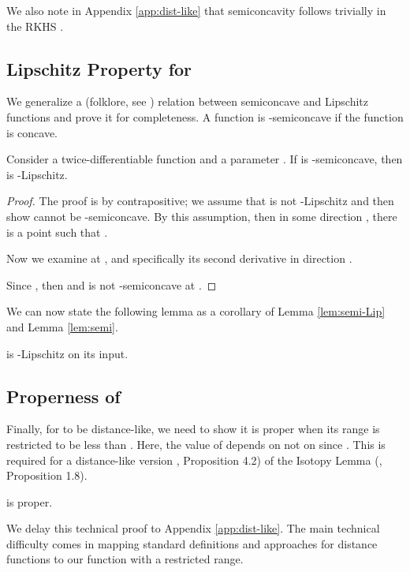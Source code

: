 \documentclass[11pt]{myclass}
\begin{document}
We also note in Appendix \ref{app:dist-like} that semiconcavity follows trivially in the RKHS .  

\subsection{Lipschitz Property for }
\label{sec:lipschitz}

We generalize a (folklore, see \cite{ChazalCohen-SteinerMerigot2011}) relation between semiconcave and Lipschitz functions and prove it for completeness.  
A function  is -semiconcave if the function  is concave.  

\begin{lemma}
Consider a twice-differentiable function  and a parameter .  
If  is -semiconcave, then  is -Lipschitz.  
\label{lem:semi-Lip}
\end{lemma}
\begin{proof}
The proof is by contrapositive; we assume that  is not -Lipschitz and then show  cannot be -semiconcave.  
By this assumption, then in some direction , there is a point  such that .  

Now we examine  at , and specifically its second derivative in direction . 

Since , then  and  is not -semiconcave at .  
\end{proof}

We can now state the following lemma as a corollary of Lemma \ref{lem:semi-Lip} and Lemma \ref{lem:semi}.  

\begin{lemma}[D1]
 is -Lipschitz on its input. 
\label{lem:Lipschitz}
\end{lemma}


\subsection{Properness of }

Finally, for  to be distance-like, we need to show it is proper when its range is restricted to be less than . Here, the value of  depends on  not on  since .
This is required for a distance-like version \cite{ChazalCohen-SteinerMerigot2011}, Proposition 4.2) of the Isotopy Lemma (\cite{Grove1993}, Proposition 1.8).  

\begin{lemma}[D3] 
 is proper. 
\label{lem:proper}
\end{lemma}


We delay this technical proof to Appendix \ref{app:dist-like}.  
The main technical difficulty comes in mapping standard definitions and approaches for distance functions to our function  with a restricted range.  
\end{document}
